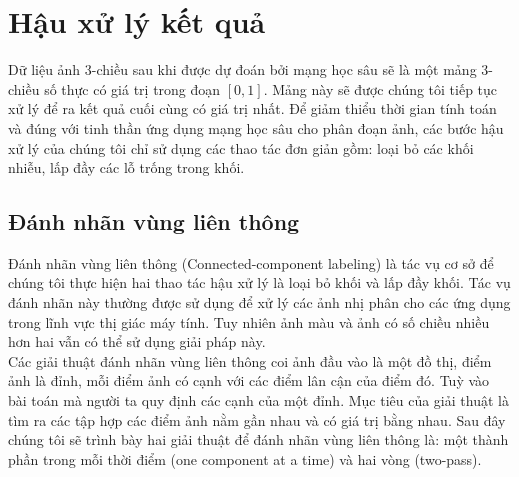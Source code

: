 \chapter{Hậu xử lý kết quả}
Dữ liệu ảnh 3-chiều sau khi được dự đoán bởi mạng học sâu sẽ là một mảng 3-chiều số thực có giá trị trong đoạn $[0,1]$. Mảng này sẽ được chúng tôi tiếp tục xử lý để ra kết quả cuối cùng có giá trị nhất. Để giảm thiểu thời gian tính toán và đúng với tinh thần ứng dụng mạng học sâu cho phân đoạn ảnh, các bước hậu xử lý của chúng tôi chỉ sử dụng các thao tác đơn giản gồm: loại bỏ các khối nhiễu, lấp đầy các lỗ trống trong khối.
\section{Đánh nhãn vùng liên thông}
Đánh nhãn vùng liên thông (Connected-component labeling) là tác vụ cơ sở để chúng tôi thực hiện hai thao tác hậu xử lý là loại bỏ khối và lấp đầy khối. Tác vụ đánh nhãn này thường được sử dụng để xử lý các ảnh nhị phân cho các ứng dụng trong lĩnh vực thị giác máy tính. Tuy nhiên ảnh màu và ảnh có số chiều nhiều hơn hai vẫn có thể sử dụng giải pháp này.\\
Các giải thuật đánh nhãn vùng liên thông coi ảnh đầu vào là một đồ thị, điểm ảnh là đỉnh, mỗi điểm ảnh có cạnh với các điểm lân cận của điểm đó. Tuỳ vào bài toán mà người ta quy định các cạnh của một đỉnh. Mục tiêu của giải thuật là tìm ra các tập hợp các điểm ảnh nằm gần nhau và có giá trị bằng nhau. Sau đây chúng tôi sẽ trình bày hai giải thuật để đánh nhãn vùng liên thông là: một thành phần trong mỗi thời điểm (one component at a time) và hai vòng (two-pass).
